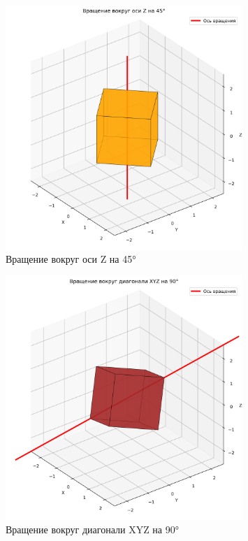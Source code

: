 \begin{figure}[H]
\centering
\includegraphics[width=0.8\textwidth]{images/task4/rotate_z.png}
\caption{Вращение вокруг оси Z на 45°}
\end{figure}

\begin{figure}[H]
\centering
\includegraphics[width=0.8\textwidth]{images/task4/rotate_xyz.png}
\caption{Вращение вокруг диагонали XYZ на 90°}
\end{figure}

